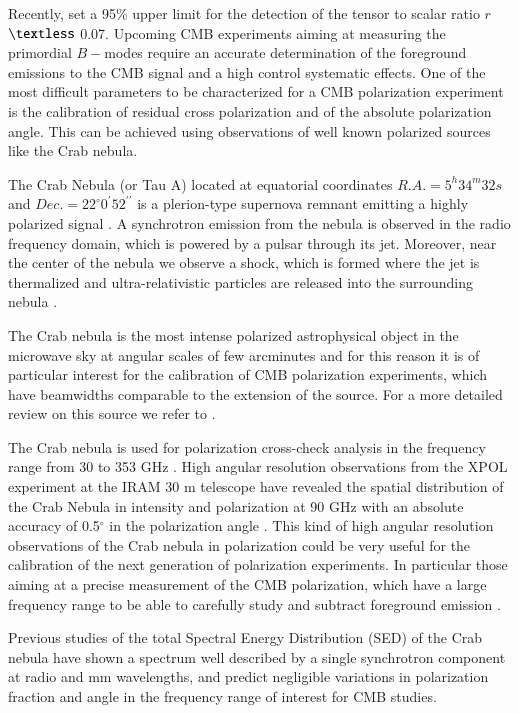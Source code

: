 \documentclass[twocolumn,traditabstract]{aa}
\begin{document}
Recently, \citet{bicepplanck2015,bicep2016} set a 95\% upper limit for the detection of the tensor to scalar ratio $r$ $\textless$ 0.07.
Upcoming CMB experiments aiming at measuring the primordial $B-$modes require an accurate determination of the foreground emissions to the CMB signal and a high control systematic effects. One of the most difficult parameters to be characterized for a CMB polarization experiment is the calibration of residual cross polarization and of the absolute polarization angle. This can be achieved using observations of well known polarized sources like the Crab nebula.

The Crab Nebula (or Tau A) located at equatorial coordinates $R.A. = 5^h34^m32s$ and $Dec. = 22^{\circ}0^{\prime}52^{\prime\prime}$ is a plerion-type supernova remnant emitting a highly polarized signal \citep{1978A&A....70..419W,1991ApJ...368..463M}.
A synchrotron emission from the nebula is observed in the radio frequency domain, which is powered by a pulsar through its jet. 
Moreover, near the center of the nebula we observe a shock, which is formed where the jet is thermalized and ultra-relativistic particles are released into the surrounding nebula \citep{2000ApJ...536L..81W,2011A&A...528A..11W}. 

The Crab nebula is the most intense polarized astrophysical object in the microwave sky at angular scales of few arcminutes and for this reason it is of particular interest  for the calibration of CMB polarization experiments, which have beamwidths comparable to the extension of the source.
For a more detailed review on this source we refer to \citet{2008ARA&A..46..127H}.

The Crab nebula is used for polarization cross-check analysis in the frequency range from 30 to 353 GHz \citep{2011ApJS..192...19W,2015arXiv150702058P}. High angular resolution observations from the XPOL experiment \citep{thum2008} at the IRAM 30 m telescope have revealed the spatial distribution of the Crab Nebula in intensity and polarization at 90 GHz with an absolute accuracy of 0.5$^{\circ}$ in the polarization angle \citep{aumont2010}. 
This kind of high angular resolution observations of the Crab nebula in polarization could be very useful for the calibration of the next generation of polarization experiments. In particular those aiming at a precise measurement of the CMB polarization, which have a large frequency range to be able to carefully study and subtract foreground emission \citep{2016IJMPD..2540008K}. 

Previous studies \citep{macias2010} of the total Spectral Energy Distribution (SED) of the Crab nebula have shown a spectrum well described by a single synchrotron component at radio and mm wavelengths, and predict negligible variations in polarization fraction and angle in the frequency range of interest for CMB studies.
 
\end{document}
